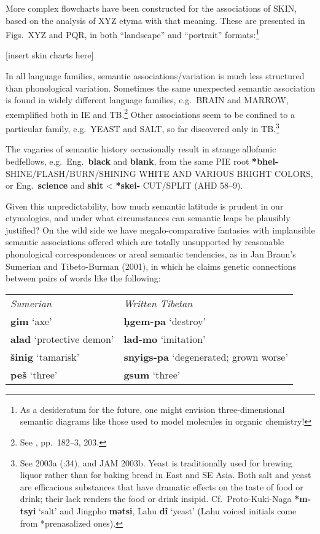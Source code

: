More complex flowcharts have been constructed for the associations of SKIN, based on the analysis of XYZ etyma with that meaning. These are presented in Figs.~XYZ and PQR, in both “landscape” and “portrait” formats:\footnote{As a desideratum for the future, one might envision three-dimensional semantic diagrams like those used to model molecules in organic chemistry!}

[insert skin charts here]

In all language families, semantic associations/variation is much less structured than phonological variation. Sometimes the same unexpected semantic association is found in widely different language families, e.g.\ BRAIN and MARROW, exemplified both in IE and TB.\footnote{See \textit{}, pp.~182–3, 203.} Other associations seem to be confined to a particular family, e.g.\ YEAST and SALT, so far discovered only in TB.\footnote{See 2003a (\textit{}:34), and JAM 2003b. Yeast is traditionally used for brewing liquor rather than for baking bread in East and SE Asia. Both salt and yeast are efficacious substances that have dramatic effects on the taste of food or drink; their lack renders the food or drink insipid. Cf.\ Proto-Kuki-Naga \textbf{*m-tsyi} ‘salt’ and Jingpho \textbf{mətsi}, Lahu \textbf{dî} ‘yeast’ (Lahu voiced initials come from *prenasalized ones).}

The vagaries of semantic history occasionally result in strange allofamic bedfellows, e.g.\ Eng.\ \textbf{black} and \textbf{blank}, from the same PIE root \textbf{*bhel-} SHINE/FLASH/BURN/SHINING WHITE AND VARIOUS BRIGHT COLORS, or Eng.\ \textbf{science} and \textbf{shit} < \textbf{*skei-} CUT/SPLIT (AHD 58–9).

Given this unpredictability, how much semantic latitude is prudent in
our etymologies, and under what circumstances can semantic leaps be
plausibly justified? On the wild side we have megalo-comparative
fantasies with implausible semantic associations offered which are
totally unsupported by reasonable phonological correspondences or
areal semantic tendencies, as in Jan Braun’s Sumerian and
Tibeto-Burman (2001), in which he claims genetic connections between
pairs of words like the following:

\begin{tabular}{l l}
		\textit{Sumerian}		&		\textit{Written Tibetan}\\
		\textbf{gim} ‘axe’		&		\textbf{ḥgem-pa} ‘destroy’\\
		\textbf{alad} ‘protective demon’	&	\textbf{lad-mo} ‘imitation’\\
		\textbf{šinig} ‘tamarisk’	&		\textbf{snyigs-pa} ‘degenerated; grown worse’\\
		\textbf{peš} ‘three’	&		\textbf{gsum} ‘three’\\
\end{tabular}

